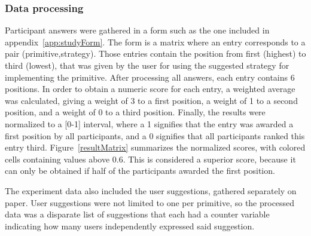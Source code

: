 
%

\subsubsection{Data processing}

Participant answers were gathered in a form such as the one included in appendix~\ref{app:studyForm}.
The form is a matrix where an entry corresponds to a pair (primitive,strategy).
Those entries contain the position from first (highest) to third (lowest), that was given by the user for using the suggested strategy for implementing the primitive.
After processing all answers, each entry contains 6 positions.
In order to obtain a numeric score for each entry, a weighted average was calculated, giving a weight of 3 to a first position, a weight of 1 to a second position, and a weight of 0 to a third position.
Finally, the results were normalized to a [0-1] interval, where a 1 signifies that the entry was awarded a first position by all participants, and a 0 signifies that all participants ranked this entry third.
Figure~\ref{resultMatrix} summarizes the normalized scores, with colored cells containing values above 0.6.
This is considered a superior score, because it can only be obtained if half of the participants awarded the first position.

The experiment data also included the user suggestions, gathered separately on paper.
User suggestions were not limited to one per primitive, so the processed data was a disparate list of suggestions that each had a counter variable indicating how many users independently expressed said suggestion.

